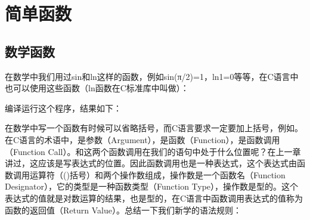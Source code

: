 

\chapter{简单函数}
%





\section{数学函数}
%
在数学中我们用过sin和ln这样的函数，例如sin(π/2)=1，ln1=\BookSplit{}0等等，在C语言中也可以使用这些函数（ln函数在C标准库中叫做）：





编译运行这个程序，结果如下：




在数学中写一个函数有时候可以省略括号，而C语言要求一定要加上括号，例如。在C语言的术语中，是参数（Argument），是函数（Function），是函数调用（Function Call）。和这两个函数调用在我们的语句中处于什么位置呢？在上一章讲过，这应该是写表达式的位置。因此函数调用也是一种表达式，这个表达式由函数调用运算符（()括号）和两个操作数组成，操作数是一个函数名（Function Designator），它的类型是一种函数类型（Function Type），操作数是型的。这个表达式的值就是对数运算的结果，也是型的，在C语言中函数调用表达式的值称为函数的返回值（Return Value）。总结一下我们新学的语法规则：


